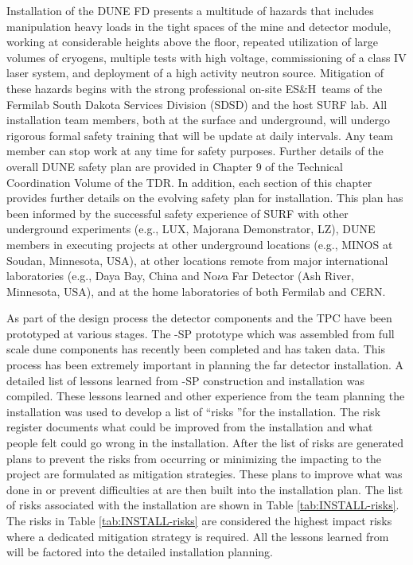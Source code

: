 

Installation of the DUNE FD presents a multitude of hazards that includes  manipulation heavy loads in the tight spaces of the mine and detector module,  working at considerable heights above the floor, repeated utilization of large volumes of cryogens, multiple tests with high voltage, commissioning of a class IV laser system, and deployment of a high activity neutron source. Mitigation of these hazards begins with the strong professional on-site ES\&H\ teams of the Fermilab South Dakota Services Division (SDSD) and the host SURF lab.
All installation team members, both at the surface and underground, will undergo rigorous formal safety training that will be update at daily intervals. Any team member can stop work at any time for safety purposes. Further details of the overall DUNE safety plan are provided in Chapter 9 of the Technical Coordination Volume of the TDR. In addition, each section of this chapter provides further details on the evolving safety plan for installation. This plan has been informed by the successful safety experience of SURF with other underground experiments (e.g., LUX, Majorana Demonstrator, LZ), DUNE members in executing projects at other underground locations (e.g., MINOS at Soudan, Minnesota, USA), at other locations remote from major international laboratories (e.g., Daya Bay, China and No$\nu $a Far Detector (Ash River, Minnesota, USA), and at the home laboratories of both Fermilab and CERN.




As part of the  design process the detector components and the TPC have been prototyped at various stages. The -SP prototype which was assembled from full scale dune components has recently been completed and has taken data. 
This process has been extremely important in planning the far detector installation. A detailed list of lessons learned from -SP construction and installation was compiled.\cite{bib:docdb8255} 
These lessons learned and other experience from the team planning the installation was used to develop a list of \textquotedblleft risks \textquotedblright for the  installation. 
The risk register documents what could be improved from the  installation and what people felt could go wrong in the  installation. After the list of risks are generated plans to prevent the risks from occurring or minimizing the impacting to the project are formulated as mitigation strategies. These plans to improve what was done in  or prevent difficulties at  are then built into the  installation plan. The list of risks associated with the  installation are shown in Table \ref{tab:INSTALL-risks}. The risks in Table \ref{tab:INSTALL-risks} are considered the highest impact risks where a dedicated mitigation strategy is required. All the lessons learned from  will be factored into the detailed installation planning.

